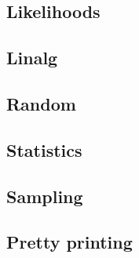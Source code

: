 \subsection{Likelihoods}


\subsection{Linalg}


\subsection{Random}


\subsection{Statistics}


\subsection{Sampling}


\subsection{Pretty printing}
